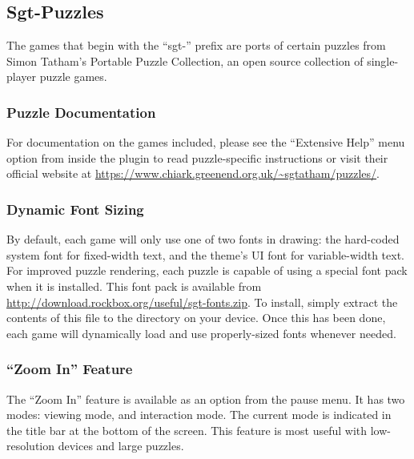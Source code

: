 \subsection{Sgt-Puzzles}

The games that begin with the ``sgt-'' prefix are ports of certain
puzzles from Simon Tatham's Portable Puzzle Collection, an open source
collection of single-player puzzle games.


\subsubsection{Puzzle Documentation}
For documentation on the games included, please see the ``Extensive
Help'' menu option from inside the plugin to read puzzle-specific
instructions or visit their official website at
\url{https://www.chiark.greenend.org.uk/~sgtatham/puzzles/}.

\subsubsection{Dynamic Font Sizing}
By default, each game will only use one of two fonts in drawing: the
hard-coded system font for fixed-width text, and the theme's UI font
for variable-width text. For improved puzzle rendering, each puzzle is
capable of using a special font pack when it is installed. This font
pack is available from
\url{http://download.rockbox.org/useful/sgt-fonts.zip}. To install,
simply extract the contents of this file to the
 directory on your device. Once this has been
done, each game will dynamically load and use properly-sized fonts
whenever needed.


\subsubsection{``Zoom In'' Feature}
The ``Zoom In'' feature is available as an option from the pause
menu. It has two modes: viewing mode, and interaction mode. The
current mode is indicated in the title bar at the bottom of the
screen. This feature is most useful with low-resolution devices and
large puzzles.

